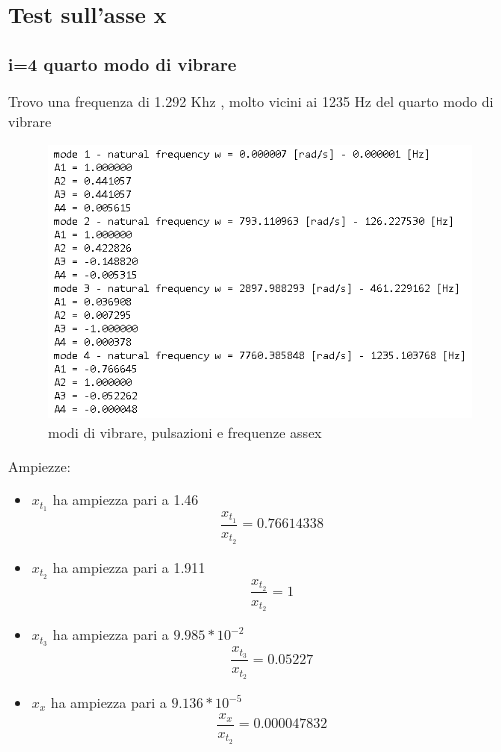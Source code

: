 \documentclass{article}
\begin{document}
\subsection{Test sull'asse x}
\subsubsection{i=4 quarto modo di vibrare}
Trovo una frequenza di 1.292 Khz  , molto vicini ai 1235 Hz del  quarto modo di vibrare

\begin{figure}[H]
\centering
\includegraphics[width=.8\textwidth]{./assex/modi.png}
\caption{modi di vibrare, pulsazioni e frequenze assex}
\end{figure}

Ampiezze:
\begin{itemize}

    \item $x_{t_1}$ ha ampiezza pari a 1.46
    \begin{equation*}
    \frac{x_{t_1}}{x_{t_2}} = 0.76614338
    \end{equation*}
    
    \item $x_{t_2}$ ha ampiezza pari a 1.911
        \begin{equation*}
    \frac{x_{t_2}}{x_{t_2}} =  1
    \end{equation*}
    
    \item $x_{t_3}$ ha ampiezza pari a $9.985*10^{-2}$
        \begin{equation*}
    \frac{x_{t_3}}{x_{t_2}} = 0.05227
    \end{equation*}
    
    \item $	x_{x}$ ha ampiezza pari a $9.136*10^{-5}$
    \begin{equation*}
    \frac{x_{x}}{x_{t_2}} =  0.000047832
    \end{equation*}
    \end{itemize}
    
\end{document}
